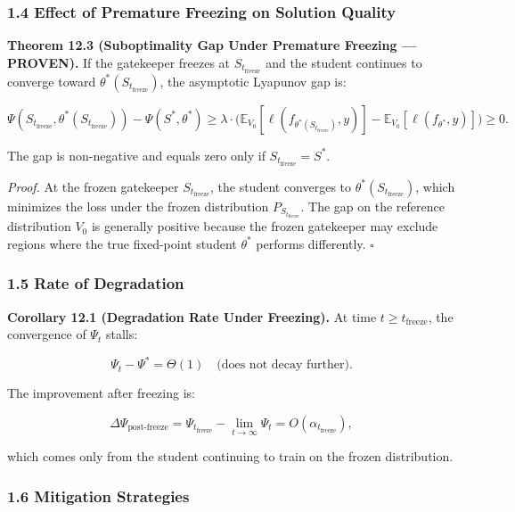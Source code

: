 \documentclass[
  12pt,
]{article}
\begin{document}
\subsubsection{1.4 Effect of Premature Freezing on Solution
Quality}\label{effect-of-premature-freezing-on-solution-quality}

\textbf{Theorem 12.3 (Suboptimality Gap Under Premature Freezing ---
PROVEN).} If the gatekeeper freezes at \(S_{t_{\text{freeze}}}\) and the
student continues to converge toward
\(\theta^*(S_{t_{\text{freeze}}})\), the asymptotic Lyapunov gap is:

\[\Psi(S_{t_{\text{freeze}}}, \theta^*(S_{t_{\text{freeze}}})) - \Psi(S^*, \theta^*) \geq \lambda \cdot \bigl(\mathbb{E}_{V_0}[\ell(f_{\theta^*(S_{t_{\text{freeze}}})}, y)] - \mathbb{E}_{V_0}[\ell(f_{\theta^*}, y)]\bigr) \geq 0.\]

The gap is non-negative and equals zero only if
\(S_{t_{\text{freeze}}} = S^*\).

\emph{Proof.} At the frozen gatekeeper \(S_{t_{\text{freeze}}}\), the
student converges to \(\theta^*(S_{t_{\text{freeze}}})\), which
minimizes the loss under the frozen distribution
\(P_{S_{t_{\text{freeze}}}}\). The gap on the reference distribution
\(V_0\) is generally positive because the frozen gatekeeper may exclude
regions where the true fixed-point student \(\theta^*\) performs
differently. \(\square\)

\subsubsection{1.5 Rate of Degradation}\label{rate-of-degradation}

\textbf{Corollary 12.1 (Degradation Rate Under Freezing).} At time
\(t \geq t_{\text{freeze}}\), the convergence of \(\Psi_t\) stalls:

\[\Psi_t - \Psi^* = \Theta(1) \quad \text{(does not decay further)}.\]

The improvement after freezing is:

\[\Delta\Psi_{\text{post-freeze}} = \Psi_{t_{\text{freeze}}} - \lim_{t \to \infty} \Psi_t = O(\alpha_{t_{\text{freeze}}}),\]

which comes only from the student continuing to train on the frozen
distribution.

\subsubsection{1.6 Mitigation Strategies}\label{mitigation-strategies}
\end{document}

